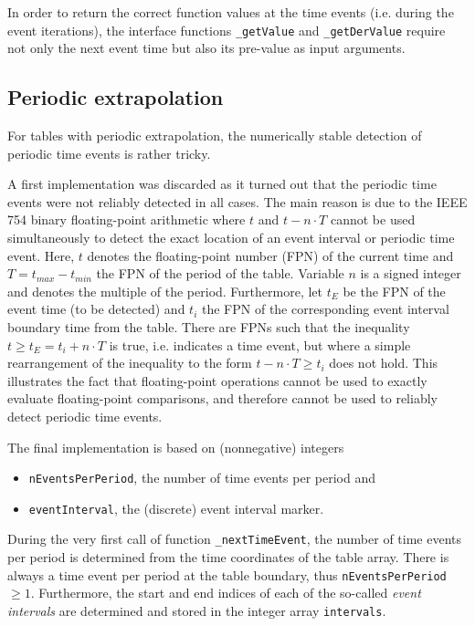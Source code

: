 \documentclass[11pt,a4paper,twocolumn]{article}
\begin{document}
In order to return the correct function values at the time events (i.e. during the event iterations), the interface functions \texttt{\_getValue} and \texttt{\_getDerValue} require not only the next event time but also its pre-value as input arguments.

\subsection{Periodic extrapolation}
For tables with periodic extrapolation, the numerically stable detection of periodic time events is rather tricky. 

A first implementation was discarded as it turned out that the periodic time events were not reliably detected in all cases. The main reason is due to the IEEE 754 binary floating-point arithmetic where $t$ and $t - n\cdot T$ cannot be used simultaneously to detect the exact location of an event interval or periodic time event. Here, $t$ denotes the floating-point number (FPN) of the current time and $T=t_{max}-t_{min}$ the FPN of the period of the table. Variable $n$ is a signed integer and denotes the multiple of the period. Furthermore, let $t_E$ be the FPN of the event time (to be detected) and $t_i$ the FPN of the corresponding event interval boundary time from the table. There are FPNs such that the inequality $t \ge t_E = t_i + n\cdot T$ is true, i.e. indicates a time event, but where a simple rearrangement of the inequality to the form $t - n\cdot T \ge t_i$ does not hold. This illustrates the fact that floating-point operations cannot be used to exactly evaluate floating-point comparisons, and therefore cannot be used to reliably detect periodic time events.


The final implementation is based on (nonnegative) integers
\begin{itemize}
\item \texttt{nEventsPerPeriod}, the number of time events per period and
\item \texttt{event\-In\-ter\-val}, the (discrete) event interval marker.
\end{itemize}
During the very first call of function \texttt{\_next\-Time\-Event}, the number of time events per period is determined from the time coordinates of the table array. There is always a time event per period at the table boundary, thus \texttt{nEventsPerPeriod}~$\ge 1$. Furthermore, the start and end indices of each of the so-called \emph{event intervals} are determined and stored in the integer array \texttt{intervals}.
\end{document}
